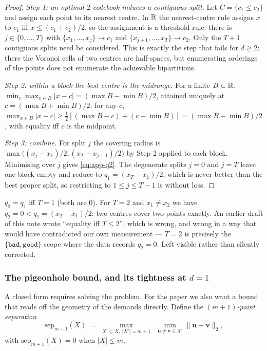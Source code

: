 \begin{proof}
\emph{Step 1: an optimal $2$-codebook induces a contiguous split.} Let
$C=\{c_1\le c_2\}$ and assign each point to its nearest centre. In $\mathbb{R}$ the
nearest-centre rule assigns $x$ to $c_1$ iff $x\le(c_1+c_2)/2$, so the assignment
is a threshold rule: there is $j\in\{0,\dots,T\}$ with $\{x_1,\dots,x_j\}\to c_1$
and $\{x_{j+1},\dots,x_T\}\to c_2$. Only the $T+1$ contiguous splits need be
considered. This is exactly the step that fails for $d\ge2$: there the Voronoi
cells of two centres are half-spaces, but enumerating orderings of the points does
not enumerate the achievable bipartitions.

\emph{Step 2: within a block the best centre is the midrange.} For a finite
$B\subset\mathbb{R}$, $\min_c\max_{x\in B}|x-c|=(\max B-\min B)/2$, attained uniquely at
$c=(\max B+\min B)/2$: for any $c$,
$\max_{x\in B}|x-c|\ge\tfrac12[(\max B-c)+(c-\min B)]=(\max B-\min B)/2$, with
equality iff $c$ is the midpoint.

\emph{Step 3: combine.} For split $j$ the covering radius is
$\max\big((x_j-x_1)/2,(x_T-x_{j+1})/2\big)$ by Step 2 applied to each block.
Minimising over $j$ gives \eqref{eq:app-q2}. The degenerate splits $j=0$ and $j=T$
leave one block empty and reduce to $q_1=(x_T-x_1)/2$, which is never better than
the best proper split, so restricting to $1\le j\le T-1$ is without loss.
\end{proof}

\begin{remark}
\label{rem:equality-clause}
$q_2=q_1$ iff $T=1$ (both are $0$). For $T=2$ and $x_1\neq x_2$ we have
$q_2=0<q_1=(x_2-x_1)/2$: two centres cover two points exactly. An earlier draft of
this note wrote ``equality iff $T\le2$'', which is wrong, and wrong in a way that
would have contradicted our own measurement --- $T=2$ is precisely the
$\{\texttt{bad},\texttt{good}\}$ scope where the data records $q_2=0$. Left visible
rather than silently corrected.
\end{remark}

\subsubsection{The pigeonhole bound, and its tightness at \texorpdfstring{$d=1$}{d=1}}

A closed form requires solving the problem. For the paper we also want a bound that
reads off the geometry of the demands directly. Define the \emph{$(m{+}1)$-point
separation}
\begin{equation}
  \mathrm{sep}_{m+1}(X)\;=\;\max_{X'\subseteq X,\ |X'|=m+1}\ \ \min_{\bm{u}\neq\bm{v}\in X'}\|\bm{u}-\bm{v}\|_2,
  \label{eq:app-sep}
\end{equation}
with $\mathrm{sep}_{m+1}(X)=0$ when $|X|\le m$.

